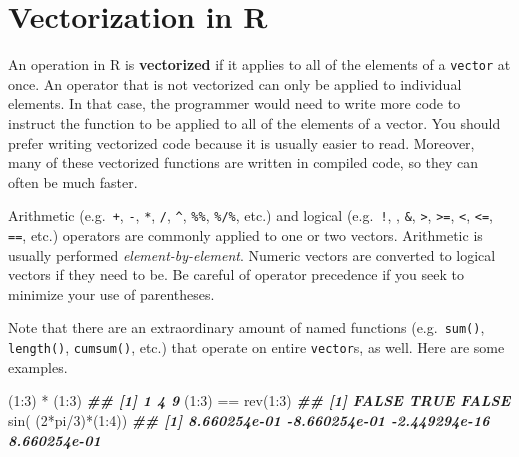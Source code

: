 \documentclass[
  12pt,
  krantz2]{krantz}
\makeatletter
\newenvironment{Shaded}{\begin{snugshade}}{\end{snugshade}}
\newcommand{\DecValTok}[1]{\textcolor[rgb]{0.06,0.06,0.06}{#1}}
\newcommand{\DocumentationTok}[1]{\textcolor[rgb]{0.37,0.37,0.37}{\textbf{\textit{#1}}}}
\newcommand{\FunctionTok}[1]{\textcolor[rgb]{0,0,0}{#1}}
\newcommand{\NormalTok}[1]{#1}
\newcommand{\SpecialCharTok}[1]{\textcolor[rgb]{0,0,0}{#1}}
\newenvironment{kframe}{%
\medskip{}
\setlength{\fboxsep}{.8em}
 \def\at@end@of@kframe{}%
 \ifinner\ifhmode%
  \def\at@end@of@kframe{\end{minipage}}%
  \begin{minipage}{\columnwidth}%
 \fi\fi%
 \def\FrameCommand##1{\hskip\@totalleftmargin \hskip-\fboxsep
 \colorbox{shadecolor}{##1}\hskip-\fboxsep
     \hskip-\linewidth \hskip-\@totalleftmargin \hskip\columnwidth}%
 \MakeFramed {\advance\hsize-\width
   \@totalleftmargin\z@ \linewidth\hsize
   \@setminipage}}%
 {\par\unskip\endMakeFramed%
 \at@end@of@kframe}
\renewenvironment{Shaded}{\begin{kframe}}{\end{kframe}}
\makeatother
\begin{document}
\hypertarget{vectorization-in-r}{%
\section{Vectorization in R}\label{vectorization-in-r}}

An operation in R is \textbf{vectorized} if it applies to all of the elements of a \texttt{vector} at once. An operator that is not vectorized can only be applied to individual elements. In that case, the programmer would need to write more code to instruct the function to be applied to all of the elements of a vector. You should prefer writing vectorized code because it is usually easier to read. Moreover, many of these vectorized functions are written in compiled code, so they can often be much faster.

Arithmetic (e.g.~\texttt{+}, \texttt{-}, \texttt{*}, \texttt{/}, \texttt{\^{}}, \texttt{\%\%}, \texttt{\%/\%}, etc.) and logical (e.g.~\texttt{!}, \texttt{\textbar{}}, \texttt{\&}, \texttt{\textgreater{}}, \texttt{\textgreater{}=}, \texttt{\textless{}}, \texttt{\textless{}=}, \texttt{==}, etc.) operators are commonly applied to one or two vectors. Arithmetic is usually performed \emph{element-by-element}. Numeric vectors are converted to logical vectors if they need to be. Be careful of operator precedence if you seek to minimize your use of parentheses.

Note that there are an extraordinary amount of named functions (e.g.~\texttt{sum()}, \texttt{length()}, \texttt{cumsum()}, etc.) that operate on entire \texttt{vector}s, as well. Here are some examples.

\begin{Shaded}
\begin{Highlighting}[]
\NormalTok{(}\DecValTok{1}\SpecialCharTok{:}\DecValTok{3}\NormalTok{) }\SpecialCharTok{*}\NormalTok{ (}\DecValTok{1}\SpecialCharTok{:}\DecValTok{3}\NormalTok{)        }
\DocumentationTok{\#\# [1] 1 4 9}
\NormalTok{(}\DecValTok{1}\SpecialCharTok{:}\DecValTok{3}\NormalTok{) }\SpecialCharTok{==} \FunctionTok{rev}\NormalTok{(}\DecValTok{1}\SpecialCharTok{:}\DecValTok{3}\NormalTok{)    }
\DocumentationTok{\#\# [1] FALSE  TRUE FALSE}
\FunctionTok{sin}\NormalTok{( (}\DecValTok{2}\SpecialCharTok{*}\NormalTok{pi}\SpecialCharTok{/}\DecValTok{3}\NormalTok{)}\SpecialCharTok{*}\NormalTok{(}\DecValTok{1}\SpecialCharTok{:}\DecValTok{4}\NormalTok{)) }
\DocumentationTok{\#\# [1]  8.660254e{-}01 {-}8.660254e{-}01 {-}2.449294e{-}16  8.660254e{-}01}
\end{Highlighting}
\end{Shaded}
\end{document}
